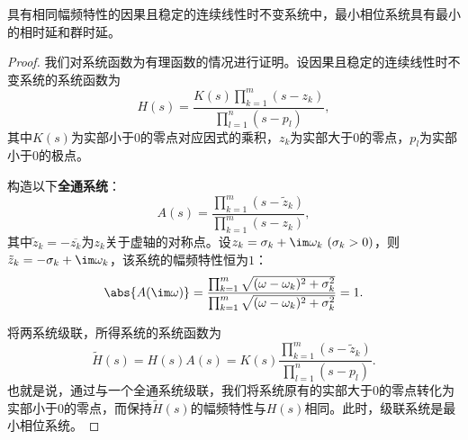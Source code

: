\begin{proposition}
    具有相同幅频特性的因果且稳定的连续线性时不变系统中，最小相位系统具有最小的相时延和群时延。
\end{proposition}
\begin{proof}
    我们对系统函数为有理函数的情况进行证明。设因果且稳定的连续线性时不变系统的系统函数为
    \begin{equation}
        H(s)=\frac{K(s)\prod_{k=1}^{m}(s-z_k)}{\prod_{l=1}^{n}(s-p_l)},
    \end{equation}
    其中$K(s)$为实部小于$0$的零点对应因式的乘积，$z_k$为实部大于$0$的零点，$p_l$为实部小于$0$的极点。

    构造以下\textbf{全通系统}：
    \begin{equation}
        A(s)=\frac{\prod_{k=1}^{m}(s-\tilde{z}_k)}{\prod_{k=1}^{m}(s-z_k)},
    \end{equation}
    其中$\tilde{z}_k=-\overline{z_k}$为$z_k$关于虚轴的对称点。设$z_k=\sigma_k+\im\omega_k\ (\sigma_k>0)$，则$\tilde{z}_k=-\sigma_k+\im\omega_k$，该系统的幅频特性恒为$1$：
    \begin{equation}
        \abs{A(\im\omega)}=\frac{\prod_{k=1}^{m}\sqrt{(\omega-\omega_k)^2+\sigma_k^2}}{\prod_{k=1}^{m}\sqrt{(\omega-\omega_k)^2+\sigma_k^2}}=1.
    \end{equation}

    将两系统级联，所得系统的系统函数为
    \begin{equation}
        \tilde{H}(s)=H(s)A(s)=K(s)\frac{\prod_{k=1}^{m}(s-\tilde{z}_k)}{\prod_{l=1}^{n}(s-p_l)}.
    \end{equation}
    也就是说，通过与一个全通系统级联，我们将系统原有的实部大于$0$的零点转化为实部小于$0$的零点，而保持$\tilde{H}(s)$的幅频特性与$H(s)$相同。此时，级联系统是最小相位系统。


\end{proof}
